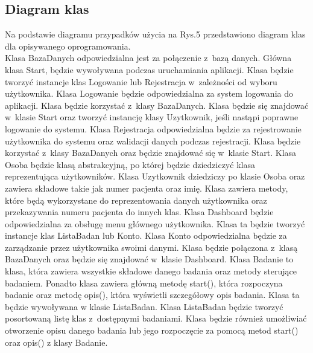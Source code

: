 \documentclass[12pt, letterpaper]{article}
\begin{document}
		\subsection{Diagram klas}
		
		Na podstawie diagramu przypadków użycia na Rys.5 przedstawiono diagram klas dla opisywanego oprogramowania.\\	
		
		Klasa {\selectfont BazaDanych} odpowiedzialna jest za połączenie z~bazą danych. Główna klasa {\selectfont Start}, będzie wywoływana podczas uruchamiania aplikacji. Klasa będzie tworzyć instancje klas Logowanie lub Rejestracja w~zależności od wyboru użytkownika. Klasa {\selectfont Logowanie} będzie odpowiedzialna za system logowania do aplikacji. Klasa będzie korzystać z~klasy BazaDanych. Klasa będzie się znajdować w~klasie Start oraz tworzyć instancję klasy Uzytkownik, jeśli nastąpi poprawne logowanie do systemu. Klasa {\selectfont Rejestracja} odpowiedzialna będzie za rejestrowanie użytkownika do systemu oraz walidacji danych podczas rejestracji. Klasa będzie korzystać z~klasy BazaDanych oraz będzie znajdować się w~klasie Start. Klasa {\selectfont Osoba} będzie klasą abstrakcyjną, po której będzie dziedziczyć klasa reprezentująca użytkowników. Klasa {\selectfont Uzytkownik} dziedziczy po klasie Osoba oraz zawiera składowe takie jak numer pacjenta oraz imię. Klasa zawiera metody, które będą wykorzystane do reprezentowania danych użytkownika oraz przekazywania numeru pacjenta do innych klas. Klasa {\selectfont Dashboard} będzie odpowiedzialna za obsługę menu głównego użytkownika. Klasa ta będzie tworzyć instancje klas ListaBadan lub Konto. Klasa {\selectfont Konto} odpowiedzialna będzie za zarządzanie przez użytkownika swoimi danymi. Klasa będzie połączona z~klasą BazaDanych oraz będzie się znajdować w~klasie Dashboard. Klasa {\selectfont Badanie} to klasa, która zawiera wszystkie składowe danego badania oraz metody sterujące badaniem. Ponadto klasa zawiera główną metodę start(), która rozpoczyna badanie oraz metodę opis(), która wyświetli szczegółowy opis badania. Klasa ta będzie wywoływana w klasie ListaBadan. Klasa {\selectfont ListaBadan} będzie tworzyć posortowaną listę klas z~dostępnymi badaniami. Klasa będzie również umożliwiać otworzenie opisu danego badania lub jego rozpoczęcie za pomocą metod start() oraz opis() z klasy Badanie.\\
		
\end{document}
